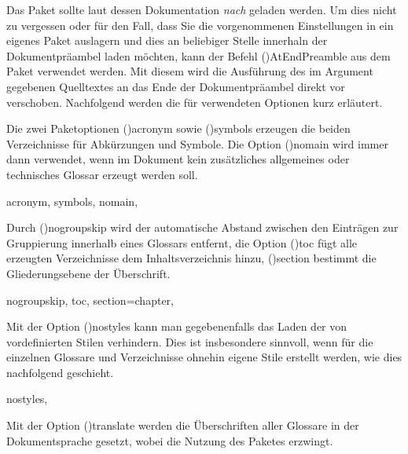 \documentclass[%
  english,ngerman,%
  cdgeometry=no,DIV=12,%
  cd=false,cdfont=false,cdtitle=true,%
  headings=normal,%
  automark,%
  listof=toc,%
]{tudscrartcl}
\begin{document}
Das Paket  sollte laut dessen Dokumentation \emph{nach} 
 geladen werden. Um dies nicht zu vergessen oder für den 
Fall, dass Sie die vorgenommenen Einstellungen in ein eigenes Paket auslagern 
und dies an beliebiger Stelle innerhaln der Dokumentpräambel laden möchten, 
kann der Befehl \Macro(){AtEndPreamble} aus dem Paket 
 verwendet werden. Mit diesem wird die Ausführung des im 
Argument gegebenen Quelltextes an das Ende der Dokumentpräambel direkt vor 
 verschoben. Nachfolgend werden die für 
 verwendeten Optionen kurz erläutert.
%
\begin{Preamble+}
\AtEndPreamble{%
\end{Preamble+}
\begin{Preamble}
\usepackage[%
\end{Preamble}
%
Die zwei Paketoptionen \Option(){acronym} sowie 
\Option(){symbols} erzeugen die beiden Verzeichnisse für 
Abkürzungen und Symbole. Die Option \Option(){nomain} wird 
immer dann verwendet, wenn im Dokument kein zusätzliches allgemeines oder 
technisches Glossar erzeugt werden soll.
%
\begin{Preamble}
  acronym,%
  symbols,%
  nomain,%
\end{Preamble}
%
Durch \Option(){nogroupskip} wird der automatische Abstand 
zwischen den Einträgen zur Gruppierung innerhalb eines Glossars entfernt, die 
Option \Option(){toc} fügt alle erzeugten Verzeichnisse 
dem Inhaltsverzeichnis hinzu, \Option(){section} bestimmt 
die Gliederungsebene der Überschrift.
%
\begin{Preamble}
  nogroupskip,%
  toc,%
  section=chapter,%
\end{Preamble}
%
Mit der Option \Option(){nostyles} kann man gegebenenfalls 
das Laden der von  vordefinierten Stilen verhindern. Dies 
ist insbesondere sinnvoll, wenn für die einzelnen Glossare und Verzeichnisse 
ohnehin eigene Stile erstellt werden, wie dies nachfolgend geschieht.
%
\begin{Preamble}
  nostyles,%
\end{Preamble}
%
Mit der Option \Option(){translate} werden die Überschriften
aller Glossare in der Dokumentsprache gesetzt, wobei  
die Nutzung des Paketes  erzwingt. 
\end{document}

